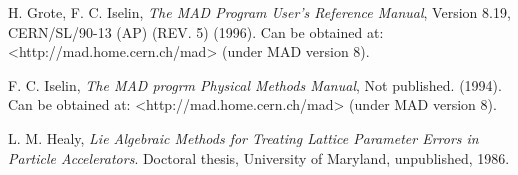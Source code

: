\begin{thebibliography}{99}

H. Grote, F. C. Iselin, {\it The MAD Program User's Reference Manual}, Version 8.19,
CERN/SL/90-13 (AP) (REV. 5) (1996). Can be obtained at: <http://mad.home.cern.ch/mad>
(under MAD version 8).

F. C. Iselin, {\it The MAD progrm Physical Methods Manual}, Not published. (1994).
Can be obtained at: <http://mad.home.cern.ch/mad> (under MAD version 8).

L. M. Healy, {\it Lie Algebraic Methods for Treating Lattice Parameter Errors in
Particle Accelerators}. Doctoral thesis, University of Maryland, unpublished, 1986.



\end{thebibliography}
